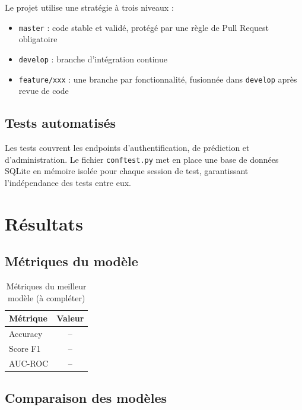 \documentclass[12pt, a4paper]{article}
\begin{document}
Le projet utilise une stratégie à trois niveaux :
\begin{itemize}
    \item \texttt{master} : code stable et validé, protégé par une règle de Pull Request obligatoire
    \item \texttt{develop} : branche d'intégration continue
    \item \texttt{feature/xxx} : une branche par fonctionnalité, fusionnée dans \texttt{develop} après revue de code
\end{itemize}

\subsection{Tests automatisés}

Les tests couvrent les endpoints d'authentification, de prédiction et d'administration. Le fichier \texttt{conftest.py} met en place une base de données SQLite en mémoire isolée pour chaque session de test, garantissant l'indépendance des tests entre eux.

\section{Résultats}

\subsection{Métriques du modèle}

\begin{table}[H]
\centering
\begin{tabular}{lc}
\toprule
\textbf{Métrique} & \textbf{Valeur} \\
\midrule
Accuracy  & -- \\
Score F1  & -- \\
AUC-ROC   & -- \\
\bottomrule
\end{tabular}
\caption{Métriques du meilleur modèle (à compléter)}
\end{table}

\subsection{Comparaison des modèles}
\end{document}
